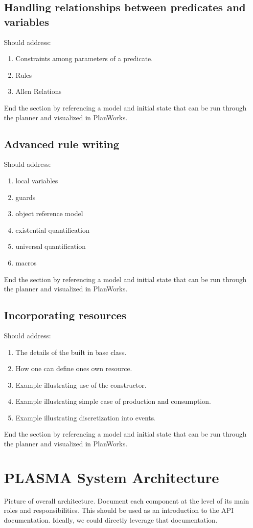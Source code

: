 \documentclass[10pt, letterpaper, twoside]{article}
\begin{document}
\subsection{Handling relationships between predicates and variables}
Should address:
\begin{enumerate}
\item Constraints among parameters of a predicate.
\item Rules
\item Allen Relations
\end{enumerate}
End the section by referencing a model and initial state that can be run through the planner and visualized in PlanWorks.

\subsection{Advanced rule writing}
Should address:
\begin{enumerate}
\item local variables
\item guards
\item object reference model
\item existential quantification
\item universal quantification
\item macros
\end{enumerate}
End the section by referencing a model and initial state that can be run through the planner and visualized in PlanWorks.

\subsection{Incorporating resources}
Should address:
\begin{enumerate}
\item The details of the built in base class. 
\item How one can define ones own resource. 
\item Example illustrating use of the constructor.
\item Example illustrating simple case of production and consumption.
\item Example illustrating discretization into events.
\end{enumerate}

End the section by referencing a model and initial state that can be run through the planner and visualized in PlanWorks.

\section{PLASMA System Architecture}
Picture of overall architecture. Document each component at the level of its main roles and responsibilities. This should be used as an introduction to the API documentation. Ideally, we could directly leverage that documentation.
\end{document}

